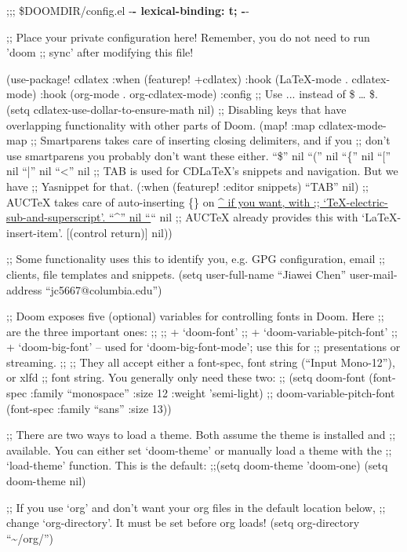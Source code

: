 \documentclass[11pt]{article}
\author{Jiawei Chen}
\date{\today}
\title{}
\begin{document}
\tableofcontents

;;; \$DOOMDIR/config.el -\textbf{- lexical-binding: t; -}-

;; Place your private configuration here! Remember, you do not need to run 'doom
;; sync' after modifying this file!

(use-package! cdlatex
  :when (featurep! +cdlatex)
  :hook (\LaTeX{}-mode . cdlatex-mode)
  :hook (org-mode . org-cdlatex-mode)
  :config
  ;; Use \(...\) instead of \$ \ldots{} \$.
  (setq cdlatex-use-dollar-to-ensure-math nil)
  ;; Disabling keys that have overlapping functionality with other parts of Doom.
  (map! :map cdlatex-mode-map
        ;; Smartparens takes care of inserting closing delimiters, and if you
        ;; don't use smartparens you probably don't want these either.
        ``\$'' nil
        ``('' nil
        ``\{'' nil
        ``['' nil
        ``|'' nil
        ``<'' nil
        ;; TAB is used for CDLaTeX's snippets and navigation. But we have
        ;; Yasnippet for that.
        (:when (featurep! :editor snippets)
          ``TAB'' nil)
        ;; AUCTeX takes care of auto-inserting \{\} on \uline{\^{} if you want, with
        ;; `\TeX{}-electric-sub-and-superscript'.
        ``\^{}'' nil
        ``}`` nil
        ;; AUCTeX already provides this with `\LaTeX{}-insert-item'.
        [(control return)] nil))

;; Some functionality uses this to identify you, e.g. GPG configuration, email
;; clients, file templates and snippets.
(setq user-full-name ``Jiawei Chen''
      user-mail-address ``jc5667@columbia.edu'')

;; Doom exposes five (optional) variables for controlling fonts in Doom. Here
;; are the three important ones:
;;
;; + `doom-font'
;; + `doom-variable-pitch-font'
;; + `doom-big-font' -- used for `doom-big-font-mode'; use this for
;;   presentations or streaming.
;;
;; They all accept either a font-spec, font string (``Input Mono-12''), or xlfd
;; font string. You generally only need these two:
;; (setq doom-font (font-spec :family ``monospace'' :size 12 :weight 'semi-light)
;;       doom-variable-pitch-font (font-spec :family ``sans'' :size 13))

;; There are two ways to load a theme. Both assume the theme is installed and
;; available. You can either set `doom-theme' or manually load a theme with the
;; `load-theme' function. This is the default:
;;(setq doom-theme 'doom-one)
(setq doom-theme nil)

;; If you use `org' and don't want your org files in the default location below,
;; change `org-directory'. It must be set before org loads!
(setq org-directory ``\textasciitilde{}/org/'')
\end{document}
